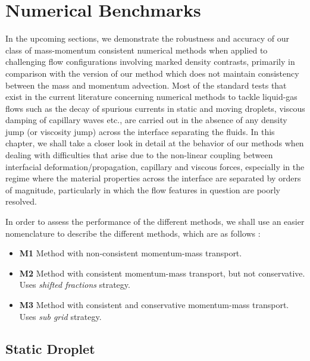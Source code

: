 \setchapterpreamble[u]{\margintoc}
\chapter{Numerical Benchmarks}

In the upcoming sections, we demonstrate the robustness and accuracy of our class of mass-momentum consistent numerical methods when applied to challenging flow configurations involving marked density contrasts, primarily in comparison with the version of our method which does not maintain consistency between the mass and momentum advection. Most of the standard tests that exist in the current literature concerning numerical methods to tackle liquid-gas flows such as the decay of spurious currents in static and moving droplets, viscous damping of capillary waves etc., are carried out in the absence of any density jump (or viscosity jump) across the interface separating the fluids. In this chapter, we shall take a closer look in detail at the behavior of our methods when dealing with difficulties that arise due to the non-linear coupling between interfacial deformation/propagation, capillary and viscous forces, especially in the regime where the material properties across the interface are separated by orders of magnitude, particularly in which the flow features in question are poorly resolved. 

In order to assess the performance of the different methods, we shall use an easier nomenclature to describe the different methods, which are as follows : 

\begin{itemize}
	\item \textbf{M1} Method with non-consistent momentum-mass transport.
	\item \textbf{M2} Method with consistent momentum-mass transport, but not conservative. Uses \textit{shifted fractions} strategy. 
	\item \textbf{M3} Method with consistent and conservative momentum-mass transport. Uses \textit{sub grid} strategy. 
\end{itemize}


\section{Static Droplet}

